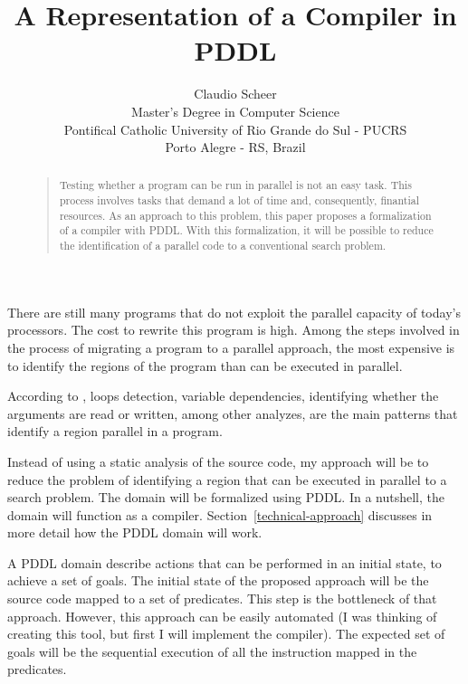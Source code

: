 \documentclass[letterpaper]{article}
\begin{document}
\title{A Representation of a Compiler in PDDL}
\author{Claudio Scheer\\
  Master's Degree in Computer Science\\
  Pontifical Catholic University of Rio Grande do Sul - PUCRS\\
  Porto Alegre - RS, Brazil\\
}
\maketitle

\begin{abstract}
  \begin{quote}
    Testing whether a program can be run in parallel is not an easy task. This process involves tasks that demand a lot of time and, consequently, finantial resources. As an approach to this problem, this paper proposes a formalization of a compiler with PDDL. With this formalization, it will be possible to reduce the identification of a parallel code to a conventional search problem.
  \end{quote}
\end{abstract}

\noindent There are still many programs that do not exploit the parallel capacity of today's processors. The cost to rewrite this program is high. Among the steps involved in the process of migrating a program to a parallel approach, the most expensive is to identify the regions of the program than can be executed in parallel.

According to \cite{doi:10.1177/1094342017695639}, loops detection, variable dependencies, identifying whether the arguments are read or written, among other analyzes, are the main patterns that identify a region parallel in a program.

Instead of using a static analysis of the source code, my approach will be to reduce the problem of identifying a region that can be executed in parallel to a search problem. The domain will be formalized using PDDL. In a nutshell, the domain will function as a compiler. Section~\ref{technical-approach} discusses in more detail how the PDDL domain will work.

A PDDL domain describe actions that can be performed in an initial state, to achieve a set of goals. The initial state of the proposed approach will be the source code mapped to a set of predicates. This step is the bottleneck of that approach. However, this approach can be easily automated (I was thinking of creating this tool, but first I will implement the compiler). The expected set of goals will be the sequential execution of all the instruction mapped in the predicates.
\end{document}
